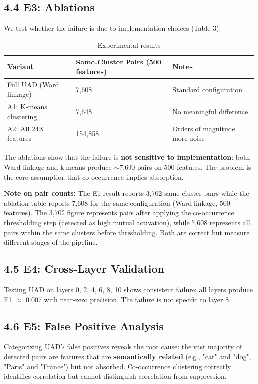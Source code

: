 \documentclass{article}
\begin{document}
\subsection{4.4 E3: Ablations}

We test whether the failure is due to implementation choices (Table 3).

\begin{table}[ht]
\centering
\begin{tabular}{lll}
\toprule
Variant & Same-Cluster Pairs (500 features) & Notes \\
\midrule
Full UAD (Ward linkage) & 7,608 & Standard configuration \\
A1: K-means clustering & 7,648 & No meaningful difference \\
A2: All 24K features & 154,858 & Orders of magnitude more noise \\
\bottomrule
\end{tabular}
\caption{Experimental results}
\end{table}

The ablations show that the failure is \textbf{not sensitive to implementation}: both Ward linkage and k-means produce $\sim$7,600 pairs on 500 features. The problem is the core assumption that co-occurrence implies absorption.

\textbf{Note on pair counts:} The E1 result reports 3,702 same-cluster pairs while the ablation table reports 7,608 for the same configuration (Ward linkage, 500 features). The 3,702 figure represents pairs after applying the co-occurrence thresholding step (detected as high mutual activation), while 7,608 represents all pairs within the same clusters before thresholding. Both are correct but measure different stages of the pipeline.

\subsection{4.5 E4: Cross-Layer Validation}

Testing UAD on layers 0, 2, 4, 6, 8, 10 shows consistent failure: all layers produce F1 $\approx$ 0.007 with near-zero precision. The failure is not specific to layer 8.

\subsection{4.6 E5: False Positive Analysis}

Categorizing UAD's false positives reveals the root cause: the vast majority of detected pairs are features that are \textbf{semantically related} (e.g., "cat" and "dog", "Paris" and "France") but not absorbed. Co-occurrence clustering correctly identifies correlation but cannot distinguish correlation from suppression.
\end{document}
